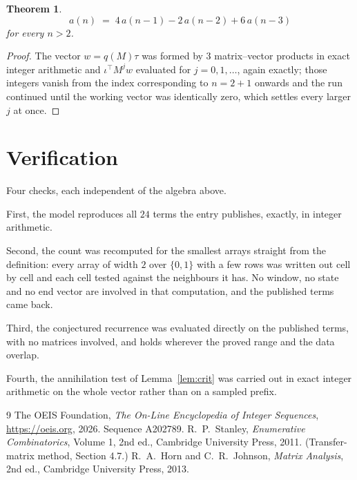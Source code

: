 \documentclass[11pt,a4paper]{article}
\theoremstyle{plain}
\newtheorem{theorem}{Theorem}
\theoremstyle{definition}
\begin{document}
\begin{theorem}
\[
a(n)\;=\;4\,a(n-1) - 2\,a(n-2) + 6\,a(n-3)
\]
for every $n>2$.
\end{theorem}

\begin{proof}
The vector $w=q(M)\tau$ was formed by $3$ matrix--vector products in exact integer
arithmetic and $\iota^{\!\top}M^{j}w$ evaluated for $j=0,1,\dots$, again exactly; those
integers vanish from the index corresponding to $n=2+1$ onwards and the run continued
until the working vector was identically zero, which settles every larger $j$ at once.
\end{proof}

\section{Verification}

Four checks, each independent of the algebra above.

First, the model reproduces all $24$ terms the entry publishes, exactly, in integer
arithmetic.

Second, the count was recomputed for the smallest arrays straight from the definition: every
array of width $2$ over $\{0,1\}$ with a few rows was written out cell by cell and each cell
tested against the neighbours it has. No window, no state and no end vector are involved in that
computation, and the published terms came back.

Third, the conjectured recurrence was evaluated directly on the published terms, with no
matrices involved, and holds wherever the proved range and the data overlap.

Fourth, the annihilation test of Lemma~\ref{lem:crit} was carried out in exact integer
arithmetic on the whole vector rather than on a sampled prefix.

\begin{thebibliography}{9}
 The OEIS Foundation, \emph{The On-Line Encyclopedia of Integer
Sequences}, \url{https://oeis.org}, 2026. Sequence A202789.
 R.~P.~Stanley, \emph{Enumerative Combinatorics}, Volume 1, 2nd ed.,
Cambridge University Press, 2011. (Transfer-matrix method, Section 4.7.)
 R.~A.~Horn and C.~R.~Johnson, \emph{Matrix Analysis}, 2nd ed., Cambridge
University Press, 2013.
\end{thebibliography}
\end{document}
